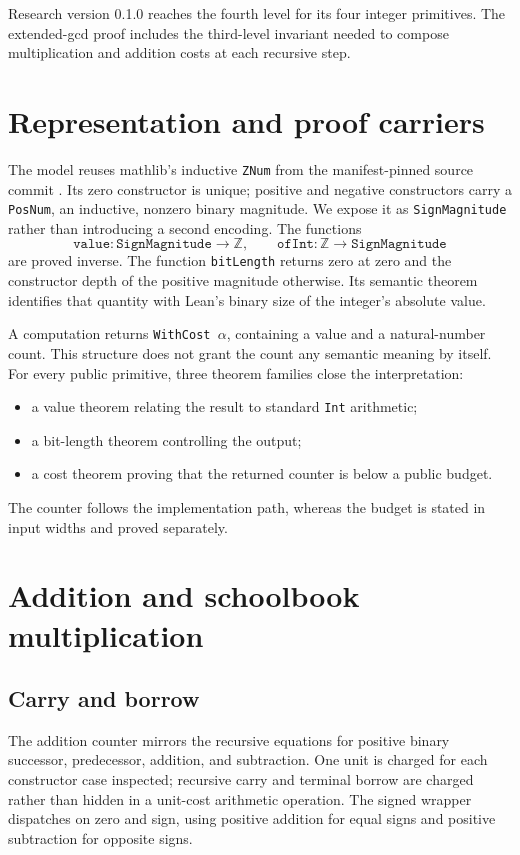 \documentclass[11pt]{article}
\newcommand{\code}[1]{\texttt{#1}}
\begin{document}
Research version 0.1.0 reaches the fourth level for its four integer
primitives.  The extended-gcd proof includes the third-level invariant needed
to compose multiplication and addition costs at each recursive step.

\section{Representation and proof carriers}

The model reuses mathlib's inductive \code{ZNum} from the manifest-pinned
source commit \citep{mathlib4320znum}.  Its zero constructor is
unique; positive and negative constructors carry a \code{PosNum}, an
inductive, nonzero binary magnitude.  We expose it as
\code{SignMagnitude} rather than introducing a second encoding.  The
functions
\[
  \code{value} : \code{SignMagnitude} \to \mathbb{Z},\qquad
  \code{ofInt} : \mathbb{Z} \to \code{SignMagnitude}
\]
are proved inverse.  The function \code{bitLength} returns zero at zero and
the constructor depth of the positive magnitude otherwise.  Its semantic
theorem identifies that quantity with Lean's binary size of the integer's
absolute value.

A computation returns \code{WithCost $\alpha$}, containing a value and a
natural-number count.  This structure does not grant the count any semantic
meaning by itself.  For every public primitive, three theorem families close
the interpretation:
\begin{itemize}
  \item a value theorem relating the result to standard \code{Int}
        arithmetic;
  \item a bit-length theorem controlling the output;
  \item a cost theorem proving that the returned counter is below a public
        budget.
\end{itemize}
The counter follows the implementation path, whereas the budget is stated in
input widths and proved separately.

\section{Addition and schoolbook multiplication}

\subsection{Carry and borrow}

The addition counter mirrors the recursive equations for positive binary
successor, predecessor, addition, and subtraction.  One unit is charged for
each constructor case inspected; recursive carry and terminal borrow are
charged rather than hidden in a unit-cost arithmetic operation.  The signed
wrapper dispatches on zero and sign, using positive addition for equal signs
and positive subtraction for opposite signs.
\end{document}
